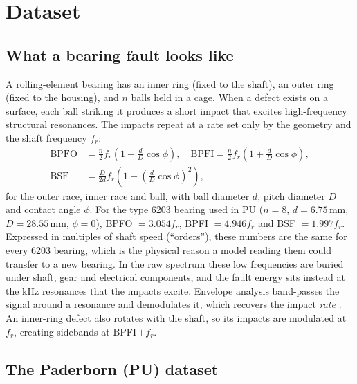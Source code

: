 \documentclass[conference]{IEEEtran}
\begin{document}
\section{Dataset}
\subsection{What a bearing fault looks like}
A rolling-element bearing has an inner ring (fixed to the shaft), an outer ring (fixed to the
housing), and $n$ balls held in a cage. When a defect exists on a surface, each ball striking it
produces a short impact that excites high-frequency structural resonances. The impacts repeat at a
rate set only by the geometry and the shaft frequency $f_r$:
\begin{align}
\mathrm{BPFO} &= \tfrac{n}{2} f_r \left(1-\tfrac{d}{D}\cos\phi\right),\quad
\mathrm{BPFI} = \tfrac{n}{2} f_r \left(1+\tfrac{d}{D}\cos\phi\right),\nonumber\\
\mathrm{BSF} &= \tfrac{D}{2d} f_r \left(1-\left(\tfrac{d}{D}\cos\phi\right)^2\right),
\end{align}
for the outer race, inner race and ball, with ball diameter $d$, pitch diameter $D$ and contact
angle $\phi$. For the type 6203 bearing used in PU ($n=8$, $d=6.75$\,mm, $D=28.55$\,mm,
$\phi=0$), BPFO $=3.054f_r$, BPFI $=4.946f_r$ and BSF $=1.997f_r$. Expressed in multiples of
shaft speed (``orders''), these numbers are the same for every 6203 bearing, which is the
physical reason a model reading them could transfer to a new bearing. In the raw spectrum these low frequencies are buried under shaft, gear and electrical components, and the fault energy sits instead at the kHz resonances that the impacts excite. Envelope analysis band-passes the signal around a resonance and demodulates it, which recovers the impact \emph{rate} \cite{randall2011}. An inner-ring defect also
rotates with the shaft, so its impacts are modulated at $f_r$, creating sidebands at
BPFI\,$\pm f_r$.




\subsection{The Paderborn (PU) dataset}
\end{document}
